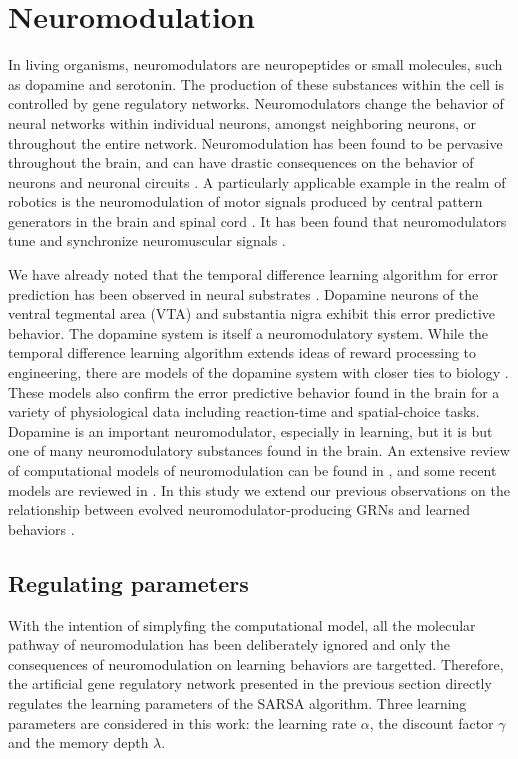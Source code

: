 \section{Neuromodulation}
In living organisms, neuromodulators are neuropeptides or small molecules, such as dopamine and
serotonin. The production of these substances within the cell is controlled by
gene regulatory networks. Neuromodulators change the behavior of neural networks
within individual neurons, amongst neighboring neurons, or throughout the entire
network. Neuromodulation has been found to be pervasive throughout the brain,
and can have drastic consequences on the behavior of neurons and neuronal
circuits \cite{Destexhe2004,Marder2012,Marder2002}. A particularly applicable
example in the realm of robotics is the neuromodulation of motor signals
produced by central pattern generators in the brain and spinal cord
\cite{Katz1995}. It has been found that neuromodulators tune and synchronize
neuromuscular signals \cite{Zhurov2006}.

We have already noted that the temporal difference learning algorithm for error
prediction has been observed in neural substrates \cite{Schultz1993}.
Dopamine neurons of the ventral tegmental area (VTA) and substantia nigra
exhibit this error predictive behavior. The dopamine system is itself a 
neuromodulatory system. While the temporal difference learning algorithm
extends ideas of reward processing to engineering, there are models of
the dopamine system with closer ties to biology \cite{Montague1996}. These
models also confirm the error predictive behavior found in the brain for a
variety of physiological data including reaction-time and spatial-choice
tasks. Dopamine is an important neuromodulator, especially in learning, but
it is but one of many neuromodulatory substances found in the brain. An
extensive review of computational models of neuromodulation can be found in
\cite{Fellous1998}, and some recent models are reviewed in \cite{Marder2012}.
In this study we extend our previous observations on the relationship between evolved neuromodulator-producing
GRNs and learned behaviors \cite{Harrington2013}. 

\subsection{Regulating parameters}
With the intention of simplyfing the computational model, all the molecular pathway of neuromodulation has been deliberately ignored and only the consequences of neuromodulation on learning behaviors are targetted. Therefore, the artificial gene regulatory network presented in the previous section directly regulates the learning parameters of the SARSA algorithm. Three learning parameters are considered in this work: the learning rate $\alpha$, the discount factor $\gamma$ and the memory depth $\lambda$.

